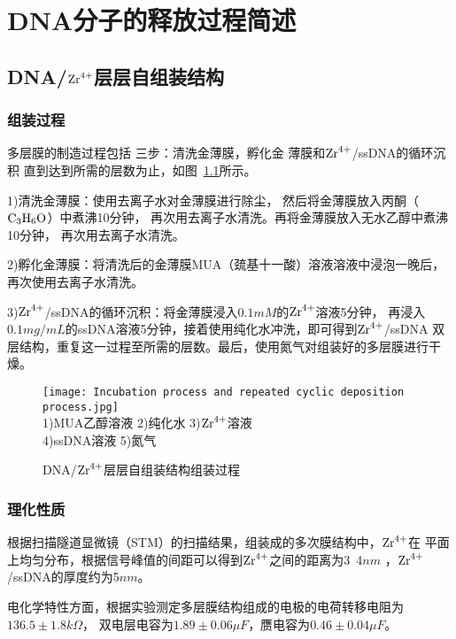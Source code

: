 \chapter{DNA分子的释放过程简述}

\section{DNA/$\ce{Zr^{4+}}$层层自组装结构}
\subsection{组装过程}
多层膜的制造过程包括
三步：清洗金薄膜，孵化金
薄膜和$\ce{Zr^{4+}}$/ssDNA的循环沉积
直到达到所需的层数为止，如图~\ref{fig:incubation_process}所示。

1)清洗金薄膜：使用去离子水对金薄膜进行除尘，
然后将金薄膜放入丙酮（$\ce{C3H6O}$）中煮沸10分钟，
再次用去离子水清洗。再将金薄膜放入无水乙醇中煮沸10分钟，
再次用去离子水清洗。

2)孵化金薄膜：将清洗后的金薄膜MUA（巯基十一酸）溶液溶液中浸泡一晚后，
再次使用去离子水清洗。

3)$\ce{Zr^{4+}}$/ssDNA的循环沉积：将金薄膜浸入$0.1mM$的$\ce{Zr^{4+}}$溶液5分钟，
再浸入$0.1mg/mL$的ssDNA溶液5分钟，接着使用纯化水冲洗，即可得到$\ce{Zr^{4+}}$/ssDNA
双层结构，重复这一过程至所需的层数。最后，使用氮气对组装好的多层膜进行干燥。

\begin{figure}[H]
    \centering
    \texttt{[image: Incubation process and repeated cyclic deposition process.jpg]}\\
    1)MUA乙醇溶液 2)纯化水 3)$\ce{Zr^{4+}}$溶液 \\
    4)ssDNA溶液 5)氮气\\
    \caption{DNA/$\ce{Zr^{4+}}$层层自组装结构组装过程}
    \label{fig:incubation_process}
\end{figure}

\subsection{理化性质}
根据扫描隧道显微镜（STM）的扫描结果，组装成的多次膜结构中，$\ce{Zr^{4+}}$在
平面上均匀分布，根据信号峰值的间距可以得到$\ce{Zr^{4+}}$之间的距离为3~4$nm$
，$\ce{Zr^{4+}}$/ssDNA的厚度约为5$nm$\cite{Shervedani2011Electrochemical}。

电化学特性方面，根据实验测定\cite{Karimi2011}多层膜结构组成的电极的电荷转移电阻为$136.5\pm1.8k\Omega$，
双电层电容为$1.89\pm0.06\mu F$，赝电容为$0.46\pm0.04\mu F$。


